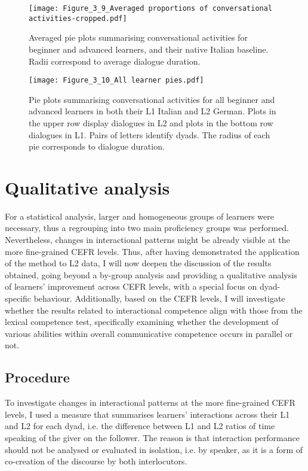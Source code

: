 \begin{figure}
\texttt{[image: Figure\_3\_9\_Averaged proportions of conversational activities-cropped.pdf]}
\caption{Averaged pie plots summarising conversational activities for beginner and advanced learners, and their native Italian baseline. Radii correspond to average dialogue duration.}
\label{fig:3.9}
\end{figure}


\begin{figure}
\texttt{[image: Figure\_3\_10\_All learner pies.pdf]}
\caption{Pie plots summarising conversational activities for all beginner and advanced learners in both their L1 Italian and L2 German. Plots in the upper row display dialogues in L2 and plots in the bottom row dialogues in L1. Pairs of letters identify dyads. The radius of each pie corresponds to dialogue duration.}
\label{fig:3.10}
\end{figure}

\section{Qualitative analysis}
\label{sec:3.4}
For a statistical analysis, larger and homogeneous groups of learners were necessary, thus a regrouping into two main proficiency groups was performed. Nevertheless, changes in interactional patterns might be already visible at the more fine-grained CEFR levels. Thus, after having demonstrated the application of the method to L2 data, I will now deepen the discussion of the results obtained, going beyond a by-group analysis and providing a qualitative analysis of learners' improvement across CEFR levels, with a special focus on dyad-specific behaviour. Additionally, based on the CEFR levels, I will investigate whether the results related to interactional competence align with those from the lexical competence test, specifically examining whether the development of various abilities within overall communicative competence occurs in parallel or not.

\subsection{Procedure}
\label{sec:3.4.1}
To investigate changes in interactional patterns at the more fine-grained CEFR levels, I used a measure that summarises learners’ interactions across their L1 and L2 for each dyad, i.e. the difference between L1 and L2 ratios of time speaking of the giver on the follower. The reason is that interaction performance should not be analysed or evaluated in isolation, i.e. by speaker, as it is a form of co-creation of the discourse by both interlocutors. 

